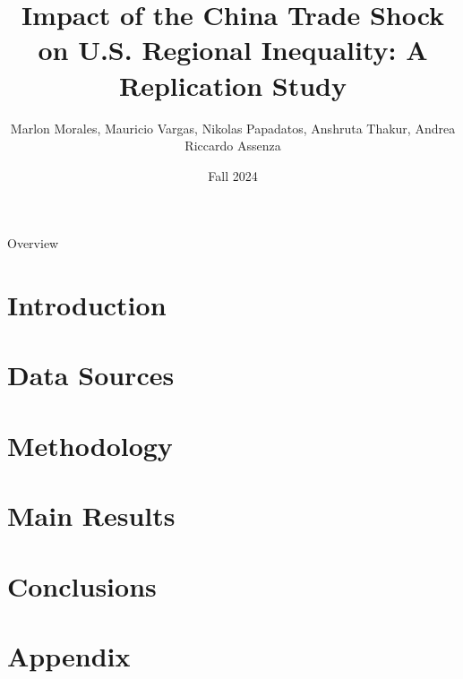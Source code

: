 \documentclass[8pt]{beamer}
\title{Impact of the China Trade Shock on U.S. Regional Inequality: A Replication Study}
\date{Fall 2024}
\author{
    Marlon Morales, Mauricio Vargas, Nikolas Papadatos, Anshruta Thakur, Andrea Riccardo Assenza
}
\begin{document}
\insertTitleSlide

\begin{frame}{Overview}
    \tableofcontents
\end{frame}


\section{Introduction}
    

\section{Data Sources}
    
\section{Methodology}
    

\section{Main Results}
    

\section{Conclusions}
    

\section{Appendix}
    
\insertLastSlide
\end{document}
